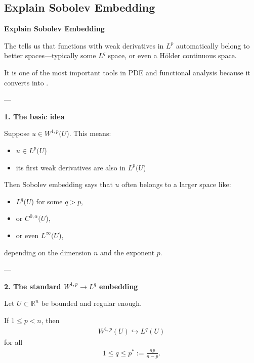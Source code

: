 \documentclass[12pt,a4paper]{report}
\begin{document}
\begin{description}
\HLINE
\newpage
\subsection*{Explain Sobolev Embedding}

\item \textbf{Explain Sobolev Embedding}

The  tells us that functions with weak derivatives in $L^p$ automatically belong to better spaces—typically some $L^q$ space, or even a Hölder continuous space.

It is one of the most important tools in PDE and functional analysis because it converts  into .

---

\begin{description}
\item \textbf{1. The basic idea}

Suppose $u\in W^{1,p}(U$).
This means:

    \begin{itemize}
    \item $u\in L^p(U$)
    \item its first weak derivatives are also in $L^p(U$)
    \end{itemize}

Then Sobolev embedding says that $u$ often belongs to a larger space like:

    \begin{itemize}
    \item $L^q(U$) for some $q>p$,
    \item or $C^{0,\alpha}(U$),
    \item or even $L^\infty(U$),
    \end{itemize}

depending on the dimension $n$ and the exponent $p$.

---

\item \textbf{2. The standard $W^{1,p}\to L^q$ embedding}

Let $U\subset \mathbb{R}^n$ be bounded and regular enough.

If $1\le p<n$, then
\begin{align*}
W^{1,p}(U)\hookrightarrow L^q(U)
\end{align*}
for all
\begin{align*}
1\le q\le p^*:=\frac{np}{n-p}.
\end{align*}


\end{description}
\end{description}
\end{document}
